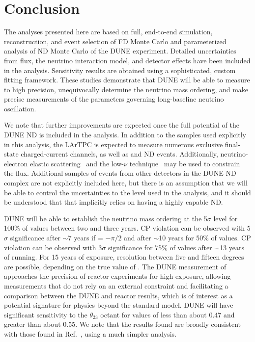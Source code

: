 \section{Conclusion}
\label{sec:conclude}

The analyses presented here are based on full, end-to-end simulation, reconstruction, and event selection of FD Monte Carlo and parameterized analysis of ND Monte Carlo of the DUNE experiment. Detailed uncertainties from flux, the neutrino interaction model, and detector effects have been included in the analysis. Sensitivity results are obtained using a sophisticated, custom fitting framework. These studies demonstrate that DUNE will be able to measure \deltacp to high precision, unequivocally determine the neutrino mass ordering, and make precise measurements of the parameters governing long-baseline neutrino oscillation.

We note that further improvements are expected once the full potential of the DUNE ND is included in the analysis. In addition to the samples used explicitly in this analysis, the LArTPC is expected to measure numerous exclusive final-state charged-current channels, as well as \nue and ND events. Additionally, neutrino-electron elastic scattering~\cite{dune_nue} and the low-$\nu$ technique~\cite{Quintas:1992yv,Yang:2000ju,Tzanov:2005kr,Adamson:2009ju,DeVan:2016rkm,Ren:2017xov} may be used to constrain the flux. Additional samples of events from other detectors in the DUNE ND complex are not explicitly included here, but there is an assumption that we will be able to control the uncertainties to the level used in the analysis, and it should be understood that that implicitly relies on having a highly capable ND.

DUNE will be able to establish the neutrino mass ordering at the 5$\sigma$ level for 100\% of \deltacp values between two and three years. CP violation can be observed with 5$\sigma$ significance after $\sim$7 years if \deltacp = $-\pi/2$ and after $\sim$10 years for 50\% of \deltacp values. CP violation can be observed with 3$\sigma$ significance for 75\% of \deltacp values after $\sim$13 years of running. For 15 years of exposure, \deltacp resolution between five and fifteen degrees are possible, depending on the true value of \deltacp. The DUNE measurement of  approaches the precision of reactor experiments for high exposure, allowing measurements that do not rely on an external  constraint and facilitating a comparison between the DUNE and reactor   results, which is of interest as a potential signature for physics beyond the standard model. DUNE will have significant sensitivity to the $\theta_{23}$ octant for values of  less than about 0.47 and greater than about 0.55. We note that the results found are broadly consistent with those found in Ref.~\cite{Acciarri:2015uup}, using a much simpler analysis.


